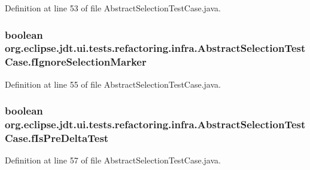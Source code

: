 Definition at line 53 of file AbstractSelectionTestCase.java.

\hypertarget{classorg_1_1eclipse_1_1jdt_1_1ui_1_1tests_1_1refactoring_1_1infra_1_1AbstractSelectionTestCase_a691421d932b78353f64606f8ec2092e1}{
\subsubsection[{fIgnoreSelectionMarker}]{\setlength{\rightskip}{0pt plus 5cm}boolean {\bf org.eclipse.jdt.ui.tests.refactoring.infra.AbstractSelectionTestCase.fIgnoreSelectionMarker}}}
\label{classorg_1_1eclipse_1_1jdt_1_1ui_1_1tests_1_1refactoring_1_1infra_1_1AbstractSelectionTestCase_a691421d932b78353f64606f8ec2092e1}


Definition at line 55 of file AbstractSelectionTestCase.java.

\hypertarget{classorg_1_1eclipse_1_1jdt_1_1ui_1_1tests_1_1refactoring_1_1infra_1_1AbstractSelectionTestCase_ae733270535b4b83e0498a76a251bf7e9}{
\subsubsection[{fIsPreDeltaTest}]{\setlength{\rightskip}{0pt plus 5cm}boolean {\bf org.eclipse.jdt.ui.tests.refactoring.infra.AbstractSelectionTestCase.fIsPreDeltaTest}}}
\label{classorg_1_1eclipse_1_1jdt_1_1ui_1_1tests_1_1refactoring_1_1infra_1_1AbstractSelectionTestCase_ae733270535b4b83e0498a76a251bf7e9}


Definition at line 57 of file AbstractSelectionTestCase.java.

